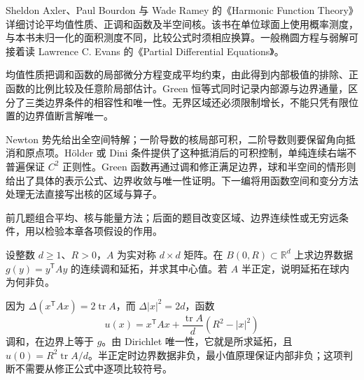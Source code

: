 \ProseParagraphBreak

Sheldon Axler、Paul Bourdon 与 Wade Ramey 的《Harmonic Function Theory》\cite[Chapters 1, 3, and 7]{Axler2001Harmonic}详细讨论平均值性质、正调和函数及半空间核。该书在单位球面上使用概率测度，与本书未归一化的面积测度不同，比较公式时须相应换算。一般椭圆方程与弱解可接着读 Lawrence C. Evans 的《Partial Differential Equations》\cite{Evans2010Partial}。






\begin{chaptersummary}
均值性质把调和函数的局部微分方程变成平均约束，由此得到内部极值的排除、正函数的比例比较及任意阶局部估计。Green 恒等式同时记录内部源与边界通量，区分了三类边界条件的相容性和唯一性。无界区域还必须限制增长，不能只凭有限位置的边界值断言解唯一。

\ProseParagraphBreak

Newton 势先给出全空间特解；一阶导数的核局部可积，二阶导数则要保留角向抵消和原点项。Hölder 或 Dini 条件提供了这种抵消后的可积控制，单纯连续右端不普遍保证 \(C^2\) 正则性。Green 函数再通过调和修正满足边界，球和半空间的情形则给出了具体的表示公式、边界收敛与唯一性证明。下一编将用函数空间和变分方法处理无法直接写出核的区域与算子。
\end{chaptersummary}

\BookExercises

前几题组合平均、核与能量方法；后面的题目改变区域、边界连续性或无穷远条件，用以检验本章各项假设的作用。

\begin{exercise}\label{b2:ex:13-quadratic-boundary}
设整数 \(d\geq1\)、\(R>0\)，\(A\) 为实对称 \(d\times d\) 矩阵。在 \(B(0,R)\subset\mathbb R^d\) 上求边界数据 \(g(y)=y^{\mathsf T}Ay\) 的连续调和延拓，并求其中心值。若 \(A\) 半正定，说明延拓在球内为何非负。
\end{exercise}
\begin{solution}
因为 \(\Delta(x^{\mathsf T}Ax)=2\operatorname{tr}A\)，而 \(\Delta|x|^2=2d\)，函数
\[
 u(x)=x^{\mathsf T}Ax+\dfrac{\operatorname{tr}A}{d}(R^2-|x|^2)
\]
调和，在边界上等于 \(g\)。由 Dirichlet 唯一性，它就是所求延拓，且 \(u(0)=R^2\operatorname{tr}A/d\)。半正定时边界数据非负，最小值原理保证内部非负；这项判断不需要从修正公式中逐项比较符号。
\end{solution}

